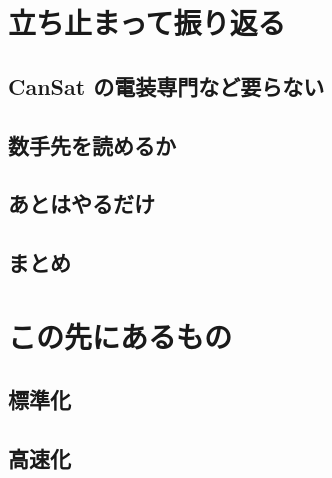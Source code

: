 \documentclass[dvipdfmx]{jsbook}
\begin{document}
\clearpage

\chapter{立ち止まって振り返る}

\section{CanSat の電装専門など要らない}

\section{数手先を読めるか}

\section{あとはやるだけ}

\section{まとめ}


\clearpage

\chapter{この先にあるもの}

\section{標準化}

\section{高速化}
\end{document}
